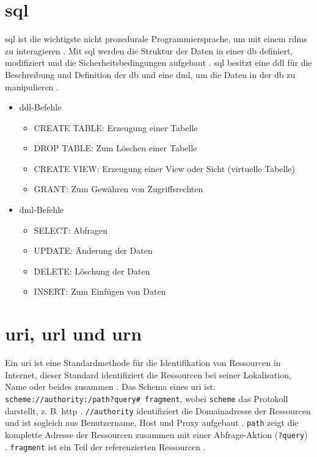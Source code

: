 \renewcommand{\cleardoublepage}{}
\renewcommand{\clearpage}{}
\clearpage

\chapter{\acs{sql}} \label{sec:sql}

\acf{sql} ist die wichtigste nicht prozedurale Programmiersprache, um mit einem \acf{rdms} zu interagieren \cite{sqlpost}. Mit \ac{sql} werden die Struktur der Daten in einer \ac{db} definiert, modifiziert und die Sicherheitsbedingungen aufgebaut \cite{dbsql}. \ac{sql} besitzt eine \ac{ddl} für die Beschreibung und Definition der \ac{db} und eine \ac{dml}, um die Daten in der \ac{db} zu manipulieren \cite{sqlpost, dbsql}.

\begin{itemize}
	\item \ac{ddl}-Befehle
	\begin{itemize}
		\item CREATE TABLE: Erzeugung einer Tabelle
		\item DROP TABLE: Zum Löschen einer Tabelle
		\item CREATE VIEW: Erzeugung einer View oder Sicht (virtuelle Tabelle)
		\item GRANT: Zum Gewähren von Zugriffsrechten
	\end{itemize}
	\item \ac{dml}-Befehle
	\begin{itemize}
		\item SELECT: Abfragen
		\item UPDATE: Änderung der Daten
		\item DELETE: Löschung der Daten
		\item INSERT: Zum Einfügen von Daten
	\end{itemize}
\end{itemize}

\chapter{\acs{uri}, \acs{url} und \acs{urn}} \label{sec:uri}

Ein \acf{uri} ist eine Standardmethode für die Identifikation von Ressourcen in Internet, dieser Standard identifiziert die Ressourcen bei seiner Lokalisation, Name oder beides zusammen \cite{uribibdiff}. Das Schema eines \ac{uri} ist: \texttt{scheme://authority:/path?query\# fragment}, wobei \texttt{scheme} das Protokoll darstellt, z. B. \glqq \ac{http}\grqq{} \cite{uribibdiff, uribibdiff2}. \texttt{//authority} identifiziert die Domainadresse der Ressourcen und ist sogleich aus Benutzername, Host und Proxy aufgebaut \cite{uribibdiff, uribibdiff3}. \texttt{path} zeigt die komplette Adresse der Ressourcen zusammen mit einer Abfrage-Aktion (\texttt{?query}) \cite{uribibdiff2}. \texttt{fragment} ist ein Teil der referenzierten Ressourcen \cite{uribibdiff}.

